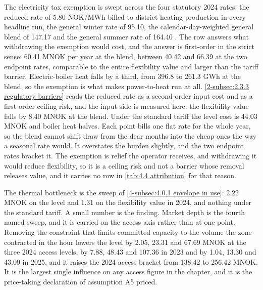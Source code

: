 The electricity tax exemption is swept across the four statutory 2024 rates: the reduced rate of 5.80 NOK/MWh billed to district heating production in every headline run, the general winter rate of 95.10, the calendar-day-weighted general blend of 147.17 and the general summer rate of 164.40 \cite{stortinget_stortingsvedtak_nodate}. The row answers what withdrawing the exemption would cost, and the answer is first-order in the strict sense: 60.41 MNOK per year at the blend, between 40.42 and 66.39 at the two endpoint rates, comparable to the entire flexibility value and larger than the tariff barrier. Electric-boiler heat falls by a third, from 396.8 to 261.3 GWh at the blend, so the exemption is what makes power-to-heat run at all. \autoref{2-subsec:2.3.3 regulatory barriers} reads the reduced rate as a second-order input cost and as a first-order ceiling risk, and the input side is measured here: the flexibility value falls by 8.40 MNOK at the blend. Under the standard tariff the level cost is 44.03 MNOK and boiler heat halves. Each point bills one flat rate for the whole year, so the blend cannot shift draw from the dear months into the cheap ones the way a seasonal rate would. It overstates the burden slightly, and the two endpoint rates bracket it. The exemption is relief the operator receives, and withdrawing it would reduce flexibility, so it is a ceiling risk and not a barrier whose removal releases value, and it carries no row in \autoref{tab:4.4 attribution} for that reason.

The thermal bottleneck is the sweep of \autoref{4-subsec:4.0.1 envelope in use}: 2.22 MNOK on the level and 1.31 on the flexibility value in 2024, and nothing under the standard tariff. A small number is the finding. Market depth is the fourth named sweep, and it is carried on the access axis rather than at one point. Removing the constraint that limits committed capacity to the volume the zone contracted in the hour lowers the level by 2.05, 23.31 and 67.69 MNOK at the three 2024 access levels, by 7.88, 48.43 and 107.36 in 2023 and by 1.04, 13.30 and 43.09 in 2025, and it raises the 2024 access bracket from 138.42 to 256.42 MNOK. It is the largest single influence on any access figure in the chapter, and it is the price-taking declaration of assumption A5 priced.

